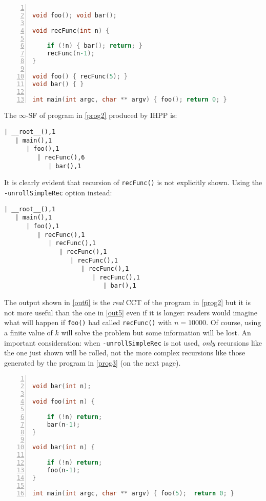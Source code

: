 \documentclass[a4paper,10pt]{report}
\begin{document}
\begin{lstlisting}[language=C,
	caption={prog2.c, a simple program that uses recursion},
	label=prog2, frame=leftline, numbers=left]

void foo(); void bar();

void recFunc(int n) {

	if (!n) { bar(); return; }
	recFunc(n-1);
}

void foo() { recFunc(5); }
void bar() { }

int main(int argc, char ** argv) { foo(); return 0; }

\end{lstlisting}

\noindent
The $\infty$-SF of program in \cref{prog2} produced by IHPP is:

\begin{lstlisting}[label=out5, caption={an example of $k$-SF \emph{without} the \texttt{unrollSimpleRec} option}, frame=bottomline]
| __root__(),1
   | main(),1
      | foo(),1
         | recFunc(),6
            | bar(),1
\end{lstlisting}

\noindent
It is clearly evident that recursion of \verb|recFunc()| is not explicitly shown.
Using the \verb|-unrollSimpleRec| option instead:
\begin{lstlisting}[label=out6, caption={an example of $k$-SF \emph{with} the \texttt{unrollSimpleRec} option}, frame=bottomline]
| __root__(),1
   | main(),1
      | foo(),1
         | recFunc(),1
            | recFunc(),1
               | recFunc(),1
                  | recFunc(),1
                     | recFunc(),1
                        | recFunc(),1
                           | bar(),1
\end{lstlisting}

\noindent
The output shown in \cref{out6} is the \emph{real} CCT of the program in \cref{prog2}
but it is not more useful than the one in \cref{out5} even if it is longer: readers
would imagine what will happen if \verb|foo()| had called \verb|recFunc()| with $n=10000$.
Of course, using a finite value of $k$ will solve the problem but some information will be lost. An important consideration: when \verb|-unrollSimpleRec| is not used, \emph{only}
recursions like the one just shown will be rolled, not the more complex recursions like
those generated by the program in \cref{prog3} (on the next page).

\begin{lstlisting}[language=C,
	caption={prog3.c, a program that uses complex recursions}, label=prog3,
	frame=leftline, numbers=left]

void bar(int n);

void foo(int n) {

	if (!n) return;
	bar(n-1);
}

void bar(int n) {

	if (!n) return;
	foo(n-1);
}

int main(int argc, char ** argv) { foo(5);	return 0; }

\end{lstlisting}
\end{document}
